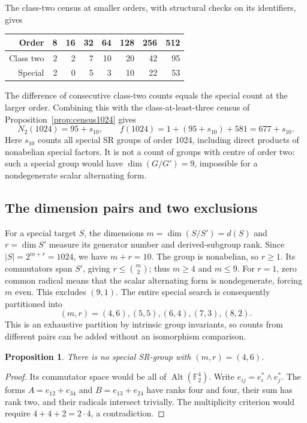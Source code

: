 \documentclass[11pt,a4paper]{amsart}
\newtheorem{prop}[thm]{Proposition}
\theoremstyle{definition}
\theoremstyle{remark}
\newcommand{\F}{\mathbb F}
\DeclareMathOperator{\Alt}{Alt}
\numberwithin{equation}{section}
\begin{document}
The class-two census at smaller orders, with structural checks on its identifiers,
gives
\begin{center}
\begin{tabular}{@{}r*{7}{r}@{}}\toprule
Order&8&16&32&64&128&256&512\\\midrule
Class two&2&2&7&10&20&42&95\\
Special&2&0&5&3&10&22&53\\\bottomrule
\end{tabular}
\end{center}
The difference of consecutive class-two counts equals the special count
at the larger order. Combining this with the class-at-least-three
census of Proposition~\ref{prop:census1024} gives
\begin{equation}\label{eq:final-count}
 N_2(1024)=95+s_{10},\qquad f(1024)=1+(95+s_{10})+581=677+s_{10}.
\end{equation}
Here $s_{10}$ counts all special SR groups of order 1024, including
direct products of nonabelian special factors. It is not a count of
groups with centre of order two: such a special group would have
$\dim(G/G')=9$, impossible for a nondegenerate scalar alternating form.

\subsection{The dimension pairs and two exclusions}
For a special target $S$, the dimensions
$m=\dim(S/S')=d(S)$ and $r=\dim S'$ measure its generator number and
derived-subgroup rank. Since $|S|=2^{m+r}=1024$, we have $m+r=10$.
The group is nonabelian, so $r\ge1$. Its commutators span $S'$, giving
$r\le\binom m2$; thus $m\ge4$ and $m\le9$.
For $r=1$, zero common radical means that the scalar alternating form
is nondegenerate, forcing $m$ even. This excludes $(9,1)$.
The entire special search is consequently partitioned into
\[
 (m,r)=(4,6),(5,5),(6,4),(7,3),(8,2).
\]
This is an exhaustive partition by intrinsic group invariants, so counts
from different pairs can be added without an isomorphism comparison.

\begin{prop}\label{prop:46-exclusion}
There is no special SR-group with $(m,r)=(4,6)$.
\end{prop}
\begin{proof}
Its commutator space would be all of $\Alt(\F_2^4)$. Write
$e_{ij}=e_i^*\wedge e_j^*$. The forms
$A=e_{12}+e_{34}$ and $B=e_{13}+e_{24}$ have ranks four and four,
their sum has rank two, and their radicals intersect trivially.
The multiplicity criterion would require $4+4+2=2\cdot4$, a contradiction.
\end{proof}
\end{document}
